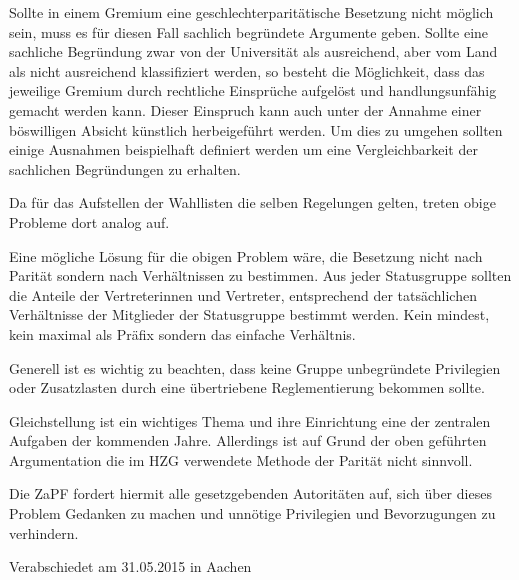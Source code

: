 \documentclass[DIV=calc]{scrartcl}
\begin{document}
Sollte in einem Gremium eine geschlechterparitätische Besetzung nicht möglich sein, muss es für
diesen Fall \glqq{}sachlich begründete\grqq{} Argumente geben. Sollte eine sachliche
Begründung zwar von der Universität als ausreichend, aber vom Land als nicht ausreichend
klassifiziert werden, so besteht die Möglichkeit, dass das jeweilige Gremium durch
rechtliche Einsprüche aufgelöst und handlungsunfähig gemacht werden kann. Dieser Einspruch
kann auch unter der Annahme einer böswilligen Absicht künstlich herbeigeführt
werden. Um dies zu umgehen sollten einige Ausnahmen beispielhaft definiert werden um
eine Vergleichbarkeit der sachlichen Begründungen zu erhalten.

Da für das Aufstellen der Wahllisten die selben Regelungen gelten, treten obige Probleme
dort analog auf.

Eine mögliche Lösung für die obigen Problem wäre, die Besetzung nicht nach Parität
sondern nach Verhältnissen zu bestimmen. Aus jeder Statusgruppe sollten die Anteile der
Vertreterinnen und Vertreter, entsprechend der tatsächlichen Verhältnisse der Mitglieder der Statusgruppe
bestimmt werden. Kein mindest, kein maximal als Präfix sondern das einfache Verhältnis.

Generell ist es wichtig zu beachten, dass keine Gruppe unbegründete Privilegien oder
Zusatzlasten durch eine übertriebene Reglementierung bekommen sollte.

Gleichstellung ist ein wichtiges Thema und ihre Einrichtung eine der zentralen Aufgaben
der kommenden Jahre. Allerdings ist auf Grund der oben geführten Argumentation
die im HZG verwendete Methode der Parität nicht sinnvoll.

Die ZaPF fordert hiermit alle gesetzgebenden Autoritäten auf, sich über dieses Problem
Gedanken zu machen und unnötige Privilegien und Bevorzugungen zu verhindern.



\vfill
\begin{flushright}
Verabschiedet am 31.05.2015 in Aachen
\end{flushright}
\end{document}

